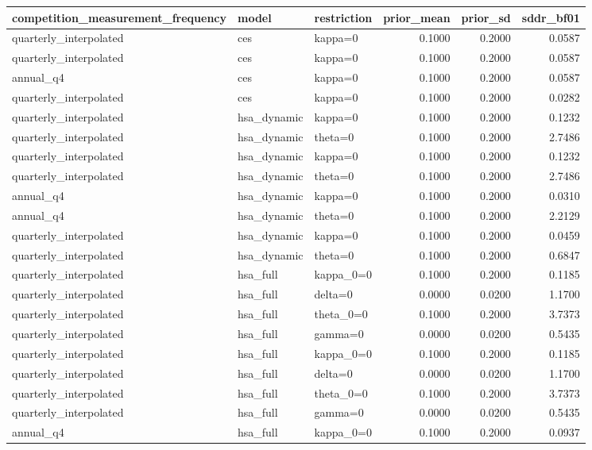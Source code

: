 \begin{tabular}{lllrrr}
\toprule
competition\_measurement\_frequency & model & restriction & prior\_mean & prior\_sd & sddr\_bf01 \\
\midrule
quarterly\_interpolated & ces & kappa=0 & 0.1000 & 0.2000 & 0.0587 \\
quarterly\_interpolated & ces & kappa=0 & 0.1000 & 0.2000 & 0.0587 \\
annual\_q4 & ces & kappa=0 & 0.1000 & 0.2000 & 0.0587 \\
quarterly\_interpolated & ces & kappa=0 & 0.1000 & 0.2000 & 0.0282 \\
quarterly\_interpolated & hsa\_dynamic & kappa=0 & 0.1000 & 0.2000 & 0.1232 \\
quarterly\_interpolated & hsa\_dynamic & theta=0 & 0.1000 & 0.2000 & 2.7486 \\
quarterly\_interpolated & hsa\_dynamic & kappa=0 & 0.1000 & 0.2000 & 0.1232 \\
quarterly\_interpolated & hsa\_dynamic & theta=0 & 0.1000 & 0.2000 & 2.7486 \\
annual\_q4 & hsa\_dynamic & kappa=0 & 0.1000 & 0.2000 & 0.0310 \\
annual\_q4 & hsa\_dynamic & theta=0 & 0.1000 & 0.2000 & 2.2129 \\
quarterly\_interpolated & hsa\_dynamic & kappa=0 & 0.1000 & 0.2000 & 0.0459 \\
quarterly\_interpolated & hsa\_dynamic & theta=0 & 0.1000 & 0.2000 & 0.6847 \\
quarterly\_interpolated & hsa\_full & kappa\_0=0 & 0.1000 & 0.2000 & 0.1185 \\
quarterly\_interpolated & hsa\_full & delta=0 & 0.0000 & 0.0200 & 1.1700 \\
quarterly\_interpolated & hsa\_full & theta\_0=0 & 0.1000 & 0.2000 & 3.7373 \\
quarterly\_interpolated & hsa\_full & gamma=0 & 0.0000 & 0.0200 & 0.5435 \\
quarterly\_interpolated & hsa\_full & kappa\_0=0 & 0.1000 & 0.2000 & 0.1185 \\
quarterly\_interpolated & hsa\_full & delta=0 & 0.0000 & 0.0200 & 1.1700 \\
quarterly\_interpolated & hsa\_full & theta\_0=0 & 0.1000 & 0.2000 & 3.7373 \\
quarterly\_interpolated & hsa\_full & gamma=0 & 0.0000 & 0.0200 & 0.5435 \\
annual\_q4 & hsa\_full & kappa\_0=0 & 0.1000 & 0.2000 & 0.0937 \\

\end{tabular}
